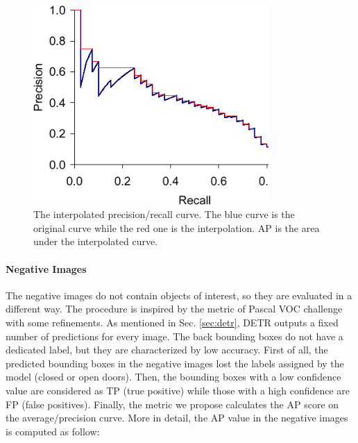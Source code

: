 \begin{figure}[h!]
	\centering
	\includegraphics[width=0.8\textwidth]{images/interpolated.png}
	\caption{The interpolated precision/recall curve. The blue curve is the original curve while the red one is the interpolation. AP is the area under the interpolated curve.}
	\label{fig:interpolation}
\end{figure}

\paragraph{Negative Images} The negative images do not contain objects of interest, so they are evaluated in a different way. The procedure is inspired by the metric of Pascal VOC challenge \cite{pascal} with some refinements. As mentioned in Sec. \ref{sec:detr}, DETR outputs a fixed number of predictions for every image. The back bounding boxes do not have a dedicated label, but they are characterized by low accuracy. First of all, the predicted bounding boxes in the negative images lost the labels assigned by the model (\textsf{closed} or \textsf{open} doors). Then, the bounding boxes with a low confidence value are considered as TP (true positive) while those with a high confidence are FP (false positives). Finally, the metric we propose calculates the AP score on the average/precision curve. More in detail, the AP value in the negative images is computed as follow:

